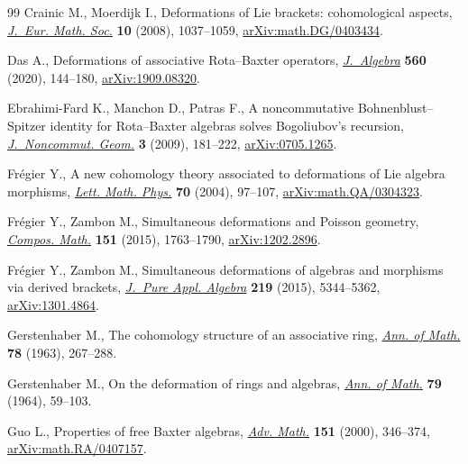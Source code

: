 \begin{thebibliography}{99}
Crainic M., Moerdijk I., Deformations of {L}ie brackets: cohomological aspects,
 \href{https://doi.org/10.4171/JEMS/139}{\textit{J.~Eur. Math. Soc.}} \textbf{10} (2008), 1037--1059,
 \href{https://arxiv.org/abs/math.DG/0403434}{arXiv:math.DG/0403434}.

Das A., Deformations of associative {R}ota--{B}axter operators,
 \href{https://doi.org/10.1016/j.jalgebra.2020.05.016}{\textit{J.~Algebra}} \textbf{560} (2020), 144--180, \href{https://arxiv.org/abs/1909.08320}{arXiv:1909.08320}.

Ebrahimi-Fard K., Manchon D., Patras F., A noncommutative
 {B}ohnenblust--{S}pitzer identity for {R}ota--{B}axter algebras solves
 {B}ogoliubov's recursion, \href{https://doi.org/10.4171/JNCG/35}{\textit{J.~Noncommut. Geom.}} \textbf{3} (2009),
 181--222, \href{https://arxiv.org/abs/0705.1265}{arXiv:0705.1265}.

Fr\'egier Y., A new cohomology theory associated to deformations of {L}ie
 algebra morphisms, \href{https://doi.org/10.1007/s11005-004-4289-0}{\textit{Lett. Math. Phys.}} \textbf{70} (2004), 97--107,
 \href{https://arxiv.org/abs/math.QA/0304323}{arXiv:math.QA/0304323}.

Fr\'egier Y., Zambon M., Simultaneous deformations and {P}oisson geometry,
 \href{https://doi.org/10.1112/S0010437X15007277}{\textit{Compos. Math.}} \textbf{151} (2015), 1763--1790, \href{https://arxiv.org/abs/1202.2896}{arXiv:1202.2896}.

Fr\'egier Y., Zambon M., Simultaneous deformations of algebras and morphisms
 via derived brackets, \href{https://doi.org/10.1016/j.jpaa.2015.05.018}{\textit{J.~Pure Appl. Algebra}} \textbf{219} (2015),
 5344--5362, \href{https://arxiv.org/abs/1301.4864}{arXiv:1301.4864}.

Gerstenhaber M., The cohomology structure of an associative ring, \href{https://doi.org/10.2307/1970343}{\textit{Ann.
 of Math.}} \textbf{78} (1963), 267--288.

Gerstenhaber M., On the deformation of rings and algebras, \href{https://doi.org/10.2307/1970484}{\textit{Ann. of
 Math.}} \textbf{79} (1964), 59--103.

Guo L., Properties of free {B}axter algebras, \href{https://doi.org/10.1006/aima.1999.1898}{\textit{Adv. Math.}} \textbf{151}
 (2000), 346--374, \href{https://arxiv.org/abs/math.RA/0407157}{arXiv:math.RA/0407157}.


\end{thebibliography}
